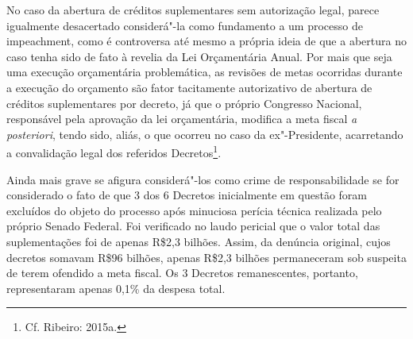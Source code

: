 No caso da abertura de créditos suplementares sem autorização legal,
parece igualmente desacertado considerá"-la como fundamento a um processo
de impeachment, como é controversa até mesmo a própria ideia de
que a abertura no caso tenha sido de fato à revelia da Lei Orçamentária
Anual. Por mais que seja uma execução orçamentária problemática, as
revisões de metas ocorridas durante a execução do orçamento são fator
tacitamente autorizativo de abertura de créditos suplementares por
decreto, já que o próprio Congresso Nacional, responsável pela aprovação
da lei orçamentária, modifica a meta fiscal \emph{a posteriori}, tendo
sido, aliás, o que ocorreu no caso da ex"-Presidente, acarretando a
convalidação legal dos referidos Decretos\footnote{Cf. Ribeiro: 2015a.}.

Ainda mais grave se afigura considerá"-los como crime de responsabilidade
se for considerado o fato de que 3 dos 6 Decretos inicialmente em
questão foram excluídos do objeto do processo após minuciosa perícia
técnica realizada pelo próprio Senado Federal. Foi verificado no laudo
pericial que o valor total das suplementações foi de apenas R\$2,3
bilhões. Assim, da denúncia original, cujos decretos somavam R\$96
bilhões, apenas R\$2,3 bilhões permaneceram sob suspeita de terem
ofendido a meta fiscal. Os 3 Decretos remanescentes, portanto,
representaram apenas 0,1\% da despesa total.

